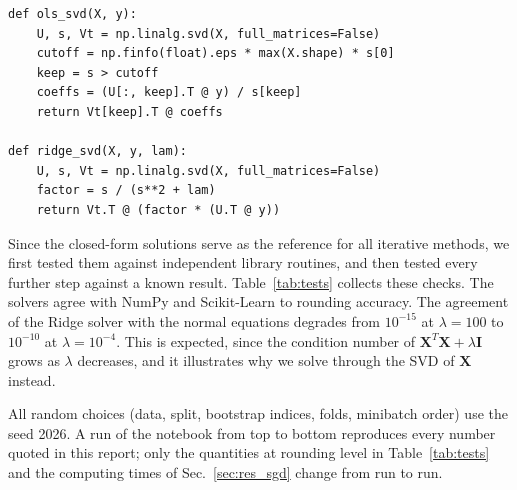 \documentclass[aps,reprint,amsmath,amssymb,nofootinbib,floatfix]{revtex4-2}
\begin{document}
\begin{lstlisting}[caption={The two closed-form solvers (comments and docstrings removed).},label={lst:svd}]
def ols_svd(X, y):
    U, s, Vt = np.linalg.svd(X, full_matrices=False)
    cutoff = np.finfo(float).eps * max(X.shape) * s[0]
    keep = s > cutoff
    coeffs = (U[:, keep].T @ y) / s[keep]
    return Vt[keep].T @ coeffs

def ridge_svd(X, y, lam):
    U, s, Vt = np.linalg.svd(X, full_matrices=False)
    factor = s / (s**2 + lam)
    return Vt.T @ (factor * (U.T @ y))
\end{lstlisting}

Since the closed-form solutions serve as the reference for all iterative methods, we first tested
them against independent library routines, and then tested every further step against a known
result. Table~\ref{tab:tests} collects these checks. The solvers agree with NumPy and Scikit-Learn
to rounding accuracy. The agreement of the Ridge solver with the normal equations degrades from
$10^{-15}$ at $\lambda=100$ to $10^{-10}$ at $\lambda=10^{-4}$. This is expected, since the
condition number of $\bm X^T\bm X+\lambda\bm I$ grows as $\lambda$ decreases, and it illustrates
why we solve through the SVD of $\bm X$ instead.

All random choices (data, split, bootstrap indices, folds, minibatch order) use the seed 2026. A
run of the notebook from top to bottom reproduces every number quoted in this report; only the
quantities at rounding level in Table~\ref{tab:tests} and the computing times of
Sec.~\ref{sec:res_sgd} change from run to run.
\end{document}
